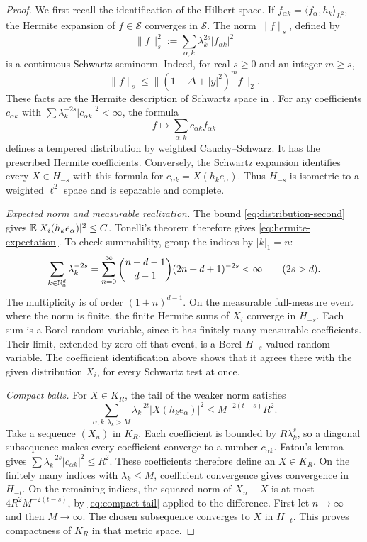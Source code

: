 \begin{proof}
We first recall the identification of the Hilbert space. If
$f_{\alpha k}=\langle f_\alpha,h_k\rangle_{L^2}$, the Hermite
expansion of $f\in\mathcal S$ converges in $\mathcal S$. The norm
$\|f\|_s$, defined by
\[
 \|f\|_s^2:=\sum_{\alpha,k}\lambda_k^{2s}|f_{\alpha k}|^2
\]
is a continuous Schwartz seminorm. Indeed, for real $s\ge0$ and
an integer $m\ge s$,
\[
 \|f\|_s\le\|(1-\Delta+|y|^2)^m f\|_2.
\]
These facts are the Hermite description
of Schwartz space in \cite[Sections~2, 4 and~5]{RadhaThangavelu}.
For any coefficients $c_{\alpha k}$ with
$\sum\lambda_k^{-2s}|c_{\alpha k}|^2<\infty$, the formula
\[
 f\longmapsto\sum_{\alpha,k}c_{\alpha k}f_{\alpha k}
\]
defines a tempered distribution by weighted Cauchy--Schwarz.
It has the prescribed Hermite coefficients. Conversely, the
Schwartz expansion identifies every $X\in H_{-s}$ with this
formula for $c_{\alpha k}=X(h_ke_\alpha)$. Thus $H_{-s}$ is
isometric to a weighted $\ell^2$ space and is separable and complete.

\emph{Expected norm and measurable realization.}
The bound \eqref{eq:distribution-second} gives
$\mathbb E|X_i(h_ke_\alpha)|^2\le C$. Tonelli's theorem therefore
gives \eqref{eq:hermite-expectation}. To check summability,
group the indices by $|k|_1=n$:
\begin{equation}\label{eq:hermite-trace}
 \sum_{k\in\mathbb N_0^d}\lambda_k^{-2s}
 =\sum_{n=0}^\infty
    \binom{n+d-1}{d-1}(2n+d+1)^{-2s}<\infty
 \qquad(2s>d).
\end{equation}
The multiplicity is of order $(1+n)^{d-1}$. On the measurable
full-measure event where the norm is finite, the finite Hermite
sums of $X_i$ converge in $H_{-s}$. Each sum is a Borel random
variable, since it has finitely many measurable coefficients.
Their limit, extended by zero off that event, is a Borel
$H_{-s}$-valued random variable. The coefficient identification
above shows that it agrees there with the given distribution
$X_i$, for every Schwartz test at once.

\emph{Compact balls.}
For $X\in K_R$, the tail of the weaker norm satisfies
\begin{equation}\label{eq:compact-tail}
 \sum_{\alpha,k:\lambda_k>M}\lambda_k^{-2t}
                    |X(h_ke_\alpha)|^2
 \le M^{-2(t-s)}R^2.
\end{equation}
Take a sequence $(X_n)$ in $K_R$. Each coefficient is bounded
by $R\lambda_k^s$, so a diagonal subsequence makes every
coefficient converge to a number $c_{\alpha k}$. Fatou's lemma
gives $\sum\lambda_k^{-2s}|c_{\alpha k}|^2\le R^2$.
These coefficients therefore define an $X\in K_R$. On the
finitely many indices with $\lambda_k\le M$, coefficient
convergence gives convergence in $H_{-t}$. On the remaining
indices, the squared norm of $X_n-X$ is at most
$4R^2M^{-2(t-s)}$, by \eqref{eq:compact-tail} applied to the
difference. First let $n\to\infty$ and then $M\to\infty$.
The chosen subsequence converges to $X$ in $H_{-t}$. This proves
compactness of $K_R$ in that metric space.


\end{proof}
